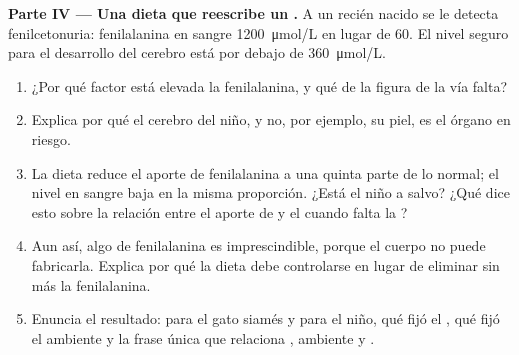 \begin{problem}
\medskip
\noindent\textbf{Parte IV --- Una dieta que reescribe un .}
A un recién nacido se le detecta fenilcetonuria: fenilalanina en sangre
\qty{1200}{\micro mol/L} en lugar de \num{60}. El nivel seguro para el
desarrollo del cerebro está por debajo de \qty{360}{\micro mol/L}.
\begin{enumerate}[resume]
  \item ¿Por qué factor está elevada la fenilalanina, y qué  de
        la figura de la vía falta?
  \item Explica por qué el cerebro del niño, y no, por ejemplo, su
        piel, es el órgano en riesgo.
  \item La dieta reduce el aporte de fenilalanina a una quinta parte de
        lo normal; el nivel en sangre baja en la misma proporción.
        ¿Está el niño a salvo? ¿Qué dice esto sobre la relación entre
        el aporte de  y el  cuando falta la ?
  \item Aun así, algo de fenilalanina es imprescindible, porque el
        cuerpo no puede fabricarla. Explica por qué la dieta debe
        controlarse en lugar de eliminar sin más la fenilalanina.
  \item Enuncia el resultado: para el gato siamés y para el niño, qué
        fijó el , qué fijó el ambiente y la frase única que
        relaciona , ambiente y .
\end{enumerate}
\end{problem}
